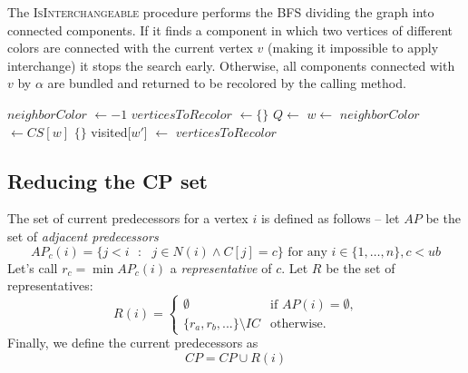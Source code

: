 The \textsc{IsInterchangeable} procedure performs the BFS dividing the graph into connected components. If it finds a component in which two vertices of different colors are connected with the current vertex $v$ (making it impossible to apply interchange) it stops the search early. Otherwise, all components connected with $v$ by $\alpha$ are bundled and returned to be recolored by the calling method.

\vspace{10pt}
\begin{algorithmic}[1]
        \ls $neighborColor$ $\gets -1$
        \ls $verticesToRecolor$ $\gets \{\}$ 
            \ls $Q \gets$ 
                \ls {}
                    \ls $w \gets$ 
                            \ls $neighborColor$ $\gets CS[w]$
                        \mElse
                            \ls \RETURN $\{\}$
                        \mEndIf
                    \mEndIf
                    \ls {}
                            \ls visited[$w'$] $\gets$ \TRUE
                            \ls {}
                        \mEndIf
                    \mEndFor
                \mEndWhile
                    \ls {}
                \mEndIf
            \mEndIf
        \mEndFor
        \ls \RETURN $verticesToRecolor$
	\mEndProcedure
\end{algorithmic}

\subsection{Reducing the CP set}

The set of current predecessors for a vertex $i$ is defined as follows -- let $AP$ be the set of \textit{adjacent predecessors}
$$AP_c(i) = \{j < i \text{ } \colon \text{ } j \in N(i) \wedge C[j] = c\}  \text{ for any } i\in \{1, \dots, n\}, c < ub   $$
Let's call $r_c = \min AP_c(i)$ a \textit{representative} of $c$. Let $R$ be the set of representatives:
\begin{equation*}
  R(i) =
    \begin{cases}
      \emptyset & \text{if $AP(i) = \emptyset$,}\\
      \{r_a, r_b, ... \} \setminus IC & \text{otherwise.}
    \end{cases}       
\end{equation*}
Finally, we define the current predecessors as
$$CP = CP \cup R(i)$$

